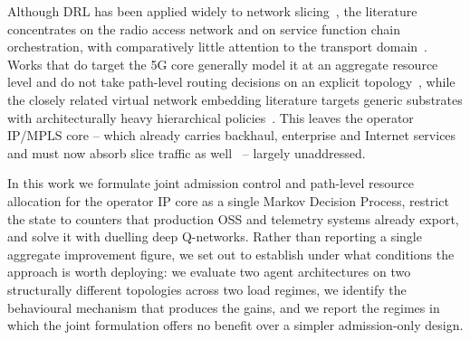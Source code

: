 \documentclass[10pt,journal,comsoc]{IEEEtran}
\begin{document}
Although DRL has been applied widely to network
slicing~\cite{ssengonzi2022survey}, the literature concentrates on the
radio access network and on service function chain orchestration, with
comparatively little attention to the transport
domain~\cite{saha2023deep}. Works that do target the 5G core generally
model it at an aggregate resource level and do not take path-level
routing decisions on an explicit
topology~\cite{villota2022admission,wang2024fsac,sulaiman2025datadriven},
while the closely related virtual network embedding literature targets
generic substrates with architecturally heavy hierarchical
policies~\cite{xiong2024hrlacra,wang2024flagvne}. This leaves the
operator IP/MPLS core -- which already carries backhaul, enterprise and
Internet services and must now absorb slice traffic
as well~\cite{10258168} -- largely unaddressed.

In this work we formulate joint admission control and path-level resource
allocation for the operator IP core as a single Markov Decision Process,
restrict the state to counters that production OSS and telemetry systems
already export, and solve it with duelling deep Q-networks. Rather than
reporting a single aggregate improvement figure, we set out to establish
under what conditions the approach is worth deploying: we evaluate two
agent architectures on two structurally different topologies across two
load regimes, we identify the behavioural mechanism that produces the
gains, and we report the regimes in which the joint formulation offers no
benefit over a simpler admission-only design.
\end{document}
